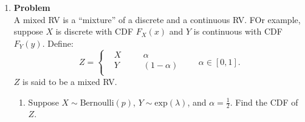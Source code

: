 \documentclass[12pt]{article}
\newenvironment{Ex}{\textbf{Problem}\vspace{.75em}\\}{}
\begin{document}
\begin{enumerate}
\begin{Ex}
\begin{solution}
    \end{solution}
  \end{Ex}
\item
  \begin{Ex}
    A mixed RV is a ``mixture'' of a discrete and a continuous RV. FOr
    example, suppose $X$ is discrete with CDF $F_X(x)$ and $Y$ is
    continuous with CDF $F_Y(y)$. Define:
    \begin{equation}
      \label{eq:6-question}
      Z = \left\{
        \begin{aligned}
          & X &&\quad \alpha \\
          & Y &&\quad (1-\alpha) \\
        \end{aligned} \right.
      \quad\quad\alpha \in [0,1].
    \end{equation}
    $Z$ is said to be a mixed RV.
    \begin{enumerate}
    \item Suppose $X \sim \text{Bernoulli}(p)$, $Y\sim
      \text{exp}(\lambda)$, and $\alpha=\frac{1}{2}$. Find the CDF of
      $Z$.


\end{enumerate}
\end{Ex}
\end{enumerate}
\end{document}

